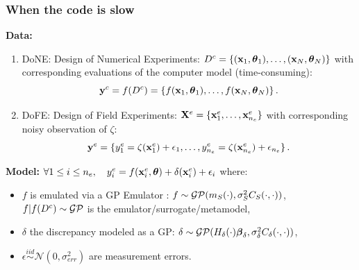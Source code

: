 \documentclass[nopagenumber,9pt]{beamer}
\begin{document}
\begin{frame}
 \frametitle{When the code is slow}

\textbf{Data:}

\begin{enumerate}
 \item DoNE: Design of Numerical Experiments: $D^c=\{(\mathbf{x}_1,\boldsymbol{\theta}_1),\ldots,(\mathbf{x}_N,\boldsymbol{\theta}_N)\}$  %
with corresponding evaluations of the computer model (time-consuming):
$$\mathbf{y}^c=f(D^c)=\{f(\mathbf{x}_1,\boldsymbol{\theta}_1),\ldots,f(\mathbf{x}_N,\boldsymbol{\theta}_N)\}\,.$$
 
 
 \item DoFE: Design of Field Experiments: $\mathbf{X}^e=\{\mathbf{x}^e_1,\ldots,\mathbf{x}^e_{n_e}\}$ with corresponding noisy observation of $\zeta$:$$\mathbf{y}^e=\{y^{e}_1=\zeta(\mathbf{x}^e_1)+\epsilon_1,\ldots,y^{e}_{n_e}=\zeta(\mathbf{x}^e_{n_e})+\epsilon_{n_e}\}\,.$$
\end{enumerate}

\smallskip

\textbf{Model:}\quad
$\forall 1\le i \le n_e,\quad y^{e}_i = f(\mathbf{x}^e_i,\boldsymbol{\theta}) + \delta(\mathbf{x}^e_i) +\epsilon_i$
where:

\smallskip
\begin{itemize}
 \item $f$ is emulated via a GP Emulator \cite{sacks1989} : $f\sim \mathcal{GP}(m_S(\cdot),\sigma_S^2C_S(\cdot,\cdot))$,\\ $f|f(D^c)\sim \mathcal{GP}$ is the emulator/surrogate/metamodel,
 \item $\delta$ the discrepancy modeled as a GP: $\delta\sim \mathcal{GP}(H_\delta(\cdot)\boldsymbol{\beta}_{\delta},\sigma_\delta^2C_\delta(\cdot,\cdot))$,
 \item $\epsilon\overset{iid}{\sim}\mathcal{N}(0,\sigma_{err}^2)$ are measurement errors.
\end{itemize}



\end{frame}
\end{document}
